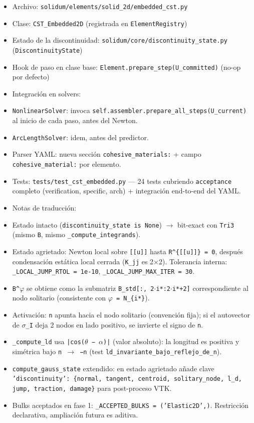 \documentclass[11pt,letterpaper,oneside]{report}
\begin{document}
\begin{itemize}
  \item Archivo: \texttt{solidum/elements/solid\_2d/embedded\_cst.py}
  \item Clase: \texttt{CST\_Embedded2D} (registrada en \texttt{ElementRegistry})
  \item Estado de la discontinuidad: \texttt{solidum/core/discontinuity\_state.py} (\texttt{DiscontinuityState})
  \item Hook de paso en clase base: \texttt{Element.prepare\_step(U\_committed)} (no-op por defecto)
  \item Integración en solvers:
  \item \texttt{NonlinearSolver}: invoca \texttt{self.assembler.prepare\_all\_steps(U\_current)} al inicio de cada paso, antes del Newton.
  \item \texttt{ArcLengthSolver}: idem, antes del predictor.
  \item Parser YAML: nueva sección \texttt{cohesive\_materials:} + campo \texttt{cohesive\_material:} por elemento.
  \item Tests: \texttt{tests/test\_cst\_embedded.py} --- 24 tests cubriendo \texttt{acceptance} completo (verification, specific, arch) + integración end-to-end del YAML.
  \item Notas de traducción:
  \item Estado intacto (\texttt{discontinuity\_state is None}) \ensuremath{\to} bit-exact con \texttt{Tri3} (mismo \texttt{B}, mismo \texttt{\_compute\_integrands}).
  \item Estado agrietado: Newton local sobre \texttt{[[u]]} hasta \texttt{R\textasciicircum{}\{[[u]]\} = 0}, después condensación estática local cerrada (\texttt{K\_jj} es 2\ensuremath{\times}2). Tolerancia interna: \texttt{\_LOCAL\_JUMP\_RTOL = 1e-10}, \texttt{\_LOCAL\_JUMP\_MAX\_ITER = 30}.
  \item \texttt{B\textasciicircum{}\ensuremath{\varphi}} se obtiene como la submatriz \texttt{B\_std[:, 2\ensuremath{\cdot}i*:2\ensuremath{\cdot}i*+2]} correspondiente al nodo solitario (consistente con \texttt{\ensuremath{\varphi} = N\_\{i*\}}).
  \item Activación: \texttt{n} apunta hacia el nodo solitario (convención fija); si el autovector de \texttt{\ensuremath{\sigma}\_I} deja 2 nodos en lado positivo, se invierte el signo de \texttt{n}.
  \item \texttt{\_compute\_ld} usa \texttt{|cos(\ensuremath{\theta} − \ensuremath{\alpha})|} (valor absoluto): la longitud es positiva y simétrica bajo \texttt{n \ensuremath{\to} −n} (test \texttt{ld\_invariante\_bajo\_reflejo\_de\_n}).
  \item \texttt{compute\_gauss\_state} extendido: en estado agrietado añade clave \texttt{'discontinuity': \{normal, tangent, centroid, solitary\_node, l\_d, jump, traction, damage\}} para post-proceso VTK.
  \item Bulks aceptados en fase 1: \texttt{\_ACCEPTED\_BULKS = ('Elastic2D',)}. Restricción declarativa, ampliación futura es aditiva.
\end{itemize}
\end{document}
